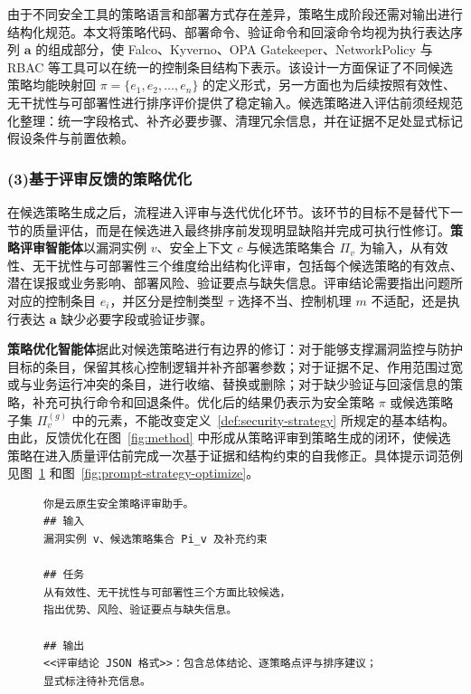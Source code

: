 由于不同安全工具的策略语言和部署方式存在差异，策略生成阶段还需对输出进行结构化规范。本文将策略代码、部署命令、验证命令和回滚命令均视为执行表达序列 $\mathbf{a}$ 的组成部分，使 Falco、Kyverno、OPA Gatekeeper、NetworkPolicy 与 RBAC 等工具可以在统一的控制条目结构下表示。该设计一方面保证了不同候选策略均能映射回 $\pi=\{e_1,e_2,\ldots,e_n\}$ 的定义形式，另一方面也为后续按照有效性、无干扰性与可部署性进行排序评价提供了稳定输入。候选策略进入评估前须经规范化整理：统一字段格式、补齐必要步骤、清理冗余信息，并在证据不足处显式标记假设条件与前置依赖。

\subsubsection{(3)基于评审反馈的策略优化}

在候选策略生成之后，流程进入评审与迭代优化环节。该环节的目标不是替代下一节的质量评估，而是在候选进入最终排序前发现明显缺陷并完成可执行性修订。\textbf{策略评审智能体}以漏洞实例 $v$、安全上下文 $c$ 与候选策略集合 $\Pi_v$ 为输入，从有效性、无干扰性与可部署性三个维度给出结构化评审，包括每个候选策略的有效点、潜在误报或业务影响、部署风险、验证要点与缺失信息。评审结论需要指出问题所对应的控制条目 $e_i$，并区分是控制类型 $\tau$ 选择不当、控制机理 $m$ 不适配，还是执行表达 $\mathbf{a}$ 缺少必要字段或验证步骤。

\textbf{策略优化智能体}据此对候选策略进行有边界的修订：对于能够支撑漏洞监控与防护目标的条目，保留其核心控制逻辑并补齐部署参数；对于证据不足、作用范围过宽或与业务运行冲突的条目，进行收缩、替换或删除；对于缺少验证与回滚信息的策略，补充可执行命令和回退条件。优化后的结果仍表示为安全策略 $\pi$ 或候选策略子集 $\Pi_v^{(g)}$ 中的元素，不能改变定义~\ref{def:security-strategy} 所规定的基本结构。由此，反馈优化在图~\ref{fig:method} 中形成从策略评审到策略生成的闭环，使候选策略在进入质量评估前完成一次基于证据和结构约束的自我修正。具体提示词范例见图~\ref{fig:prompt-strategy-review} 和图~\ref{fig:prompt-strategy-optimize}。


\begin{figure}[htb]
    \centering
    \setlength{\abovecaptionskip}{3pt}
    \setlength{\belowcaptionskip}{0pt}
    \begin{tcolorbox}[enhanced,colback=gray!3,colframe=gray!55,boxrule=0.4pt,arc=1mm,left=2mm,right=2mm,top=0.5mm,bottom=0.5mm,title={\small \textbf{策略评审智能体提示词简化示例}},fonttitle=\bfseries,coltitle=black]
    \begin{BVerbatim}[fontsize=\small,baselinestretch=0.8]
你是云原生安全策略评审助手。
## 输入
漏洞实例 v、候选策略集合 Pi_v 及补充约束

## 任务
从有效性、无干扰性与可部署性三个方面比较候选，
指出优势、风险、验证要点与缺失信息。

## 输出
<<评审结论 JSON 格式>>：包含总体结论、逐策略点评与排序建议；
显式标注待补充信息。
    \end{BVerbatim}
    \end{tcolorbox}
    \label{fig:prompt-strategy-review}
\end{figure}


